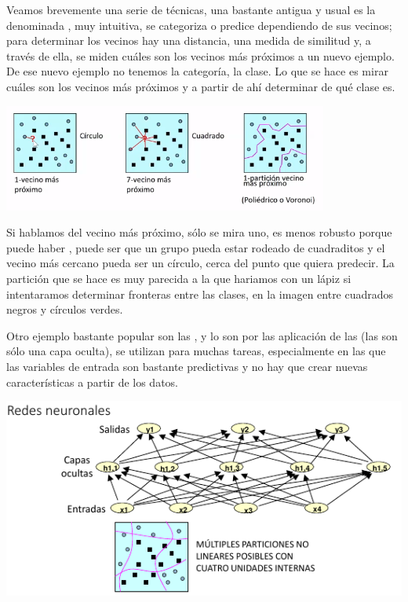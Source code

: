 Veamos brevemente una serie de técnicas, una bastante antigua y usual es la denominada , muy intuitiva, se categoriza o predice dependiendo de sus vecinos; para determinar los vecinos hay una distancia, una medida de similitud y, a través de ella, se miden cuáles son los vecinos más próximos a un nuevo ejemplo. De ese nuevo ejemplo no tenemos la categoría, la clase. Lo que se hace es mirar cuáles son los vecinos más próximos y a partir de ahí determinar de qué clase es.

\begin{center}
    \includegraphics[scale=.9]{images/mod01-22.png}
\end{center}

Si hablamos del vecino más próximo, sólo se mira uno, es menos robusto porque puede haber , puede ser que un grupo pueda estar rodeado de cuadraditos y el vecino más cercano pueda ser un círculo, cerca del punto que quiera predecir. La partición que se hace es muy parecida a la que hariamos con un lápiz si intentaramos determinar fronteras entre las clases, en la imagen entre cuadrados negros y círculos verdes.

Otro ejemplo bastante popular son las , y lo son por las aplicación de las  (las  son sólo una capa oculta), se utilizan para muchas tareas, especialmente en las que las variables de entrada son bastante predictivas y no hay que crear nuevas características a partir de los datos. 

\begin{center}
    \includegraphics[scale=.9]{images/mod01-23.png}
\end{center}

